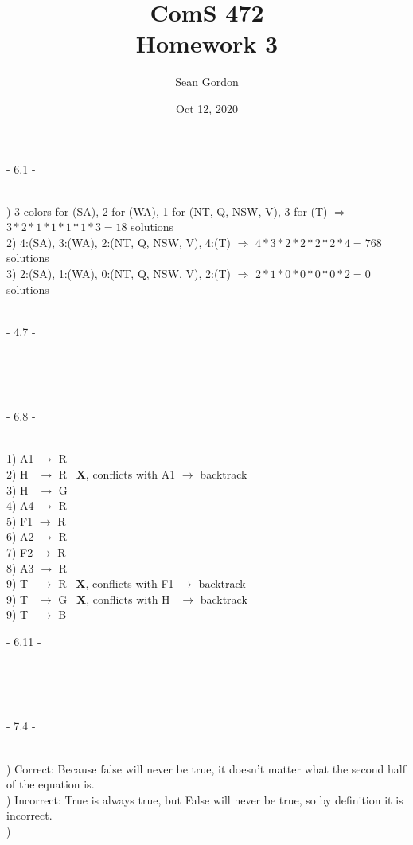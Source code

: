 \documentclass[12pt]{article}
\title{ComS 472\\Homework 3}
\author{Sean Gordon}
\date{Oct 12, 2020}
\begin{document}
\maketitle


\centerline{- 6.1 - }
\ \\
) 3 colors for (SA), 2 for (WA), 1 for (NT, Q, NSW, V), 3 for (T) $\Rightarrow$ \\\indent $3*2*1*1*1*1*3=18$ solutions\\[.4em]
2) 4:(SA), 3:(WA), 2:(NT, Q, NSW, V), 4:(T) $\Rightarrow$ $4*3*2*2*2*2*4=768$ solutions\\[.4em]
3) 2:(SA), 1:(WA), 0:(NT, Q, NSW, V), 2:(T) $\Rightarrow$ $2*1*0*0*0*0*2=0$ solutions\\[.4em]



\noindent \hrulefill \\



\centerline{- 4.7 - }
\ \\
\noindent \\



\noindent \hrulefill \\



\centerline{- 6.8 - }
\ \\
1) A1 $\rightarrow$ R \ \checkmark\\
2) H \ $\rightarrow$ R \ \textbf{X}, conflicts with A1 $\rightarrow$ backtrack \\
3) H \ $\rightarrow$ G \ \checkmark\\
4) A4 $\rightarrow$ R \ \checkmark\\
5) F1 $\rightarrow$ R \ \checkmark\\
6) A2 $\rightarrow$ R \ \checkmark\\
7) F2 $\rightarrow$ R \ \checkmark\\
8) A3 $\rightarrow$ R \ \checkmark\\
9) T \ $\rightarrow$ R \ \textbf{X}, conflicts with F1 $\rightarrow$ backtrack \\
9) T \ $\rightarrow$ G \ \textbf{X}, conflicts with H \ $\rightarrow$ backtrack \\
9) T \ $\rightarrow$ B \ \checkmark\\



\centerline{- 6.11 - }
\ \\
\noindent \\


\noindent \hrulefill \\



\centerline{- 7.4 - }
\ \\
) Correct: Because false will never be true, it doesn't matter what the second half of the equation is.\\
) Incorrect: True is always true, but False will never be true, so by definition it is incorrect.\\
) 



\noindent \hrulefill \\
\end{document}
